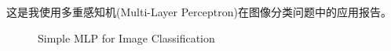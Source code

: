 这是我使用多重感知机(Multi-Layer Perceptron)在图像分类问题中的应用报告。

\begin{figure}
    
    \caption{Simple MLP for Image Classification}
\end{figure}